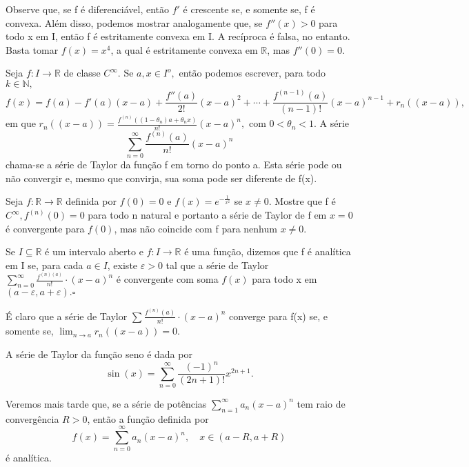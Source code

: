 \documentclass[analysis_notes.tex]{subfiles}
\begin{document}
Observe que, se f é diferenciável, então \(f'\) é crescente se, e somente se,
f é convexa. Além disso, podemos mostrar analogamente que, se \(f''(x) > 0\) para
todo x em I, então f é estritamente convexa em I. A recíproca é falsa, no entanto.
Basta tomar \(f(x) = x^{4}\), a qual é estritamente convexa em \(\mathbb{R}\), mas
\(f''(0) = 0.\)

Seja \(f:I\rightarrow \mathbb{R}\) de classe \(C^{\infty}.\) Se \(a, x\in I^{o},\) então
podemos escrever, para todo \(k\in \mathbb{N},\)
\[
	f(x) = f(a) - f'(a)(x-a) + \frac{f''(a)}{2!}(x-a)^{2} + \cdots + \frac{f^{(n-1)}(a)}{(n-1)!}(x-a)^{n-1} + r_{n}((x-a)),
\]
em que \(r_{n}((x-a))=\frac{f^{(n)}((1-\theta_{n})a+\theta_{n}x)}{n!}(x-a)^{n},\) com
\(0 < \theta_{n} < 1.\) A série
\[
	\sum\limits_{n=0}^{\infty}\frac{f^{(n)}(a)}{n!}(x-a)^{n}
\]
chama-se a série de Taylor da fun\c cão f em torno do ponto a. Esta série
pode ou não convergir e, mesmo que convirja, sua soma pode ser diferente
de f(x).
\begin{example}
	Seja \(f:\mathbb{R}\rightarrow \mathbb{R}\) definida por \(f(0)=0\) e
	\(f(x)=e^{-\frac{1}{x^{2}}}\) se \(x\neq0.\) Mostre que f é \(C^{\infty}, f^{(n)}(0)=0\)
	para todo n natural e portanto a série de Taylor de f em \(x=0\) é convergente para
	\(f(0)\), mas não coincide com f para nenhum \(x\neq0.\)
\end{example}
\begin{def*}
	Se \(I\subseteq{\mathbb{R}}\) é um intervalo aberto e \(f:I\rightarrow \mathbb{R}\)
	é uma fun\c cão, dizemos que f é analítica em I se, para cada \(a\in I\), existe
	\(\varepsilon >0\) tal que a série de Taylor \(\sum\limits_{n=0}^{\infty}\frac{f^{(n)(a)}}{n!}\cdot (x-a)^{n}\)
	é convergente com soma \(f(x)\) para todo x em \((a-\varepsilon, a+\varepsilon ).\square\)
\end{def*}
É claro que a série de Taylor \(\sum\limits_{}^{}\frac{f^{(n)}(a)}{n!}\cdot (x-a)^{n}\) converge
para f(x) se, e somente se, \(\lim_{n\to a}r_{n}((x-a))=0.\)
\begin{example}
	A série de Taylor da fun\c cão seno é dada por
	\[
		\sin{(x)} = \sum\limits_{n=0}^{\infty}\frac{(-1)^{n}}{(2n+1)!}x^{2n+1}.
	\]
\end{example}
Veremos mais tarde que, se a série de potências \(\sum\limits_{n=1}^{\infty}a_{n}(x-a)^{n}\)
tem raio de convergência \(R>0\), então a fun\c cão definida por
\[
	f(x) = \sum\limits_{n=0}^{\infty}a_{n}(x-a)^{n}, \quad x\in(a-R, a+R)
\]
é analítica.
\end{document}
